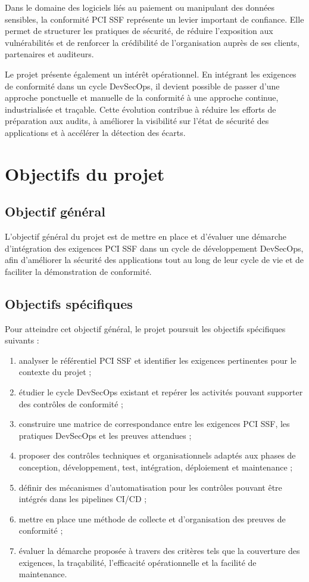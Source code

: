 \documentclass[12pt,a4paper]{report}
\begin{document}
Dans le domaine des logiciels liés au paiement ou manipulant des données sensibles, la conformité PCI SSF représente un levier important de confiance. Elle permet de structurer les pratiques de sécurité, de réduire l'exposition aux vulnérabilités et de renforcer la crédibilité de l'organisation auprès de ses clients, partenaires et auditeurs.

Le projet présente également un intérêt opérationnel. En intégrant les exigences de conformité dans un cycle DevSecOps, il devient possible de passer d'une approche ponctuelle et manuelle de la conformité à une approche continue, industrialisée et traçable. Cette évolution contribue à réduire les efforts de préparation aux audits, à améliorer la visibilité sur l'état de sécurité des applications et à accélérer la détection des écarts.

\section{Objectifs du projet}

\subsection{Objectif général}

L'objectif général du projet est de mettre en place et d'évaluer une démarche d'intégration des exigences PCI SSF dans un cycle de développement DevSecOps, afin d'améliorer la sécurité des applications tout au long de leur cycle de vie et de faciliter la démonstration de conformité.

\subsection{Objectifs spécifiques}

Pour atteindre cet objectif général, le projet poursuit les objectifs spécifiques suivants :

\begin{enumerate}
    \item analyser le référentiel PCI SSF et identifier les exigences pertinentes pour le contexte du projet ;
    \item étudier le cycle DevSecOps existant et repérer les activités pouvant supporter des contrôles de conformité ;
    \item construire une matrice de correspondance entre les exigences PCI SSF, les pratiques DevSecOps et les preuves attendues ;
    \item proposer des contrôles techniques et organisationnels adaptés aux phases de conception, développement, test, intégration, déploiement et maintenance ;
    \item définir des mécanismes d'automatisation pour les contrôles pouvant être intégrés dans les pipelines CI/CD ;
    \item mettre en place une méthode de collecte et d'organisation des preuves de conformité ;
    \item évaluer la démarche proposée à travers des critères tels que la couverture des exigences, la traçabilité, l'efficacité opérationnelle et la facilité de maintenance.
\end{enumerate}
\end{document}
